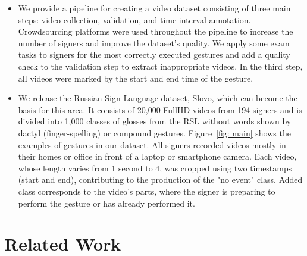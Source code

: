 \documentclass[runningheads]{llncs}
\begin{document}
\begin{itemize}
\item We provide a pipeline for creating a video dataset consisting of three main steps: video collection, validation, and time interval annotation. Crowdsourcing platforms were used throughout the pipeline to increase the number of signers and improve the dataset's quality. We apply some exam tasks to signers for the most correctly executed gestures and add a quality check to the validation step to extract inappropriate videos. In the third step, all videos were marked by the start and end time of the gesture.
\item We release the Russian Sign Language dataset, Slovo, which can become the basis for this area. It consists of 20,000 FullHD videos from 194 signers and is divided into 1,000 classes of glosses from the RSL without words shown by dactyl (finger-spelling) or compound gestures. Figure~\ref{fig: main} shows the examples of gestures in our dataset. All signers recorded videos mostly in their homes or office in front of a laptop or smartphone camera. Each video, whose length varies from 1 second to 4, was cropped using two timestamps (start and end), contributing to the production of the "no event" class. Added class corresponds to the video's parts, where the signer is preparing to perform the gesture or has already performed it.
\end{itemize}



\section{Related Work}
\end{document}
